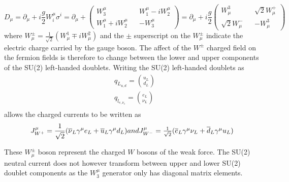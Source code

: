 \begin{equation}
  D_{\mu} = \partial_{\mu} + i\frac{g}{2}W^{\mu}_{i} \sigma^{i} = \partial_{\mu} + \begin{pmatrix} W^{\mu}_{3} && W^{\mu}_{1} - iW^{\mu}_{2}\\W^{\mu}_{1} + iW^{\mu}_{2} && -W^{\mu}_{3}\end{pmatrix} = \partial_{\mu} + i\frac{g}{2}\begin{pmatrix}W^{3}_{\mu} && \sqrt{2}W^{+}_{\mu}\\\sqrt{2}W^{-}_{\mu} && -W^{3}_{\mu}\end{pmatrix}
\end{equation}
where $W^{\pm}_{\mu} = \frac{1}{\sqrt{2}}(W^{1}_{\mu}\mp iW^{2}_{\mu})$ and the $\pm$ superscript on the  $W^{\pm}_{\mu}$ indicate the electric charge carried by the gauge boson. The affect of the $W^{\pm}$ charged field on the fermion fields is therefore to change between the lower and upper components of the SU(2) left-handed doublets. Writing the SU(2) left-handed doublets as
\begin{equation}
  \begin{split}
    &q_{L_{u,d}} = \binom{u_{L}}{d_{L}}\\
    &q_{l_{e,\nu_{e}}} = \binom{e_{L}}{\nu_{L}}\\
    \end{split}
\end{equation}
 allows the charged currents to be written as
\begin{equation}
    J_{W^{+}}^{\mu} = \frac{1}{\sqrt{2}}(\overline{\nu}_{L}\gamma^{\mu}e_{L} + \overline{u}_{L}\gamma^{\mu}d_{L}) $$and$$ J_{W^{-}}^{\mu} = \frac{1}{\sqrt{2}}(\overline{e}_{L}\gamma^{\mu}\nu_{L} + \overline{d}_{L}\gamma^{\mu}u_{L})
    \label{eq:chargedcurr}
\end{equation}


These $W^{\pm}_{\mu}$ boson represent the charged $W$ bosons of the weak force.
The SU(2) neutral current does not however transform between upper and lower SU(2) doublet components as the $W^{\mu}_{3}$ generator only has diagonal matrix elements.










